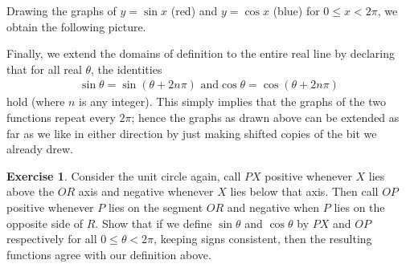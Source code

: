 \documentclass[a4paper,leqno]{article}
\numberwithin{equation}{section}
\theoremstyle{definition}
\newtheorem{exercise}[equation]{Exercise}
\theoremstyle{remark}
\begin{document}
Drawing the graphs of $ y = \sin x $ (red) and $ y = \cos x $ (blue) for $ 0 \leq x < 2\pi $, we obtain the
following picture.
\begin{center}
\end{center}

Finally, we extend the domains of definition to the entire real line by declaring that for all real $ \theta $, the identities
\begin{gather}
  \sin \theta = \sin (\theta + 2n\pi)\text{ and}
  \cos \theta = \cos (\theta + 2n\pi)
\end{gather}
hold (where $ n $ is any integer). This simply implies that the graphs of the two functions repeat every $ 2\pi $; hence the graphs
as drawn above can be extended as far as we like in either direction by just making shifted copies of the bit we already drew.
\begin{center}
\end{center}


\begin{exercise}\label{ex:geomdefn}
  Consider the unit circle again, call $ PX $ positive whenever $ X $ lies above the $ OR $ axis and negative whenever $ X $ lies below that
  axis. Then call $ OP $ positive whenever $ P $ lies on the segment $ OR $ and negative when $ P $ lies on the opposite side of $ R $. Show
  that if we define $ \sin \theta $ and $ \cos \theta $ by $ PX $ and $ OP $ respectively for all $ 0 \leq \theta < 2\pi $, keeping signs
  consistent, then the resulting functions agree with our definition above.
\end{exercise}
\end{document}
